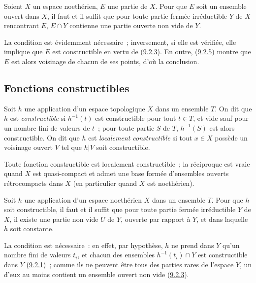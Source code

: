 \begin{corollary}[9.2.6]
\label{0.9.2.6-fr}
Soient $X$ un espace noethérien, $E$ une partie de $X$. Pour que $E$ soit un
ensemble ouvert dans $X$, il faut et il suffit que pour toute partie fermée
irréductible $Y$ de $X$ rencontrant $E$, $E\cap Y$ contienne une partie
ouverte non vide de $Y$.
\end{corollary}

La condition est évidemment nécessaire~; inversement, si elle est vérifiée,
elle implique que $E$ est constructible en vertu de
(\hyperref[0.9.2.3-fr]{9.2.3}). En outre,
(\hyperref[0.9.2.5-fr]{9.2.5}) montre que $E$ est alors voisinage de chacun
de ses points, d'où la conclusion.

\subsection{Fonctions constructibles}
\label{subsection:0.9.3-fr}

\begin{definition}[9.3.1]
\label{0.9.3.1-fr}
Soit $h$ une application d'un espace topologique $X$ dans un ensemble $T$.
On dit que $h$ est \emph{constructible} si $h^{-1}(t)$ est constructible pour
tout $t\in T$, et vide sauf pour un nombre fini de valeurs de $t$~; pour
toute partie $S$ de $T$, $h^{-1}(S)$ est alors constructible. On dit que $h$
est \emph{localement constructible} si tout $x\in X$ possède un voisinage
ouvert $V$ tel que $h|V$ soit constructible.
\end{definition}

Toute fonction constructible est localement constructible~; la réciproque
est vraie quand $X$ est quasi-compact et admet une base formée d'ensembles
ouverts rétrocompacts dans $X$ (en particulier quand $X$ est noethérien).

\begin{proposition}[9.3.2]
\label{0.9.3.2-fr}
Soit $h$ une application d'un espace noethérien $X$ dans un ensemble $T$.
Pour que $h$ soit constructible, il faut et il suffit que pour toute partie
fermée irréductible $Y$ de $X$, il existe une partie non vide $U$ de $Y$,
ouverte par rapport à $Y$, et dans laquelle $h$ soit constante.
\end{proposition}

La condition est nécessaire~: en effet, par hypothèse, $h$ ne prend dans $Y$
qu'un nombre fini de valeurs $t_i$, et chacun des ensembles
$h^{-1}(t_i)\cap Y$ est constructible dans $Y$
(\hyperref[0.9.2.1-fr]{9.2.1})~; comme ils ne peuvent être tous des parties
rares de l'espace $Y$, un d'eux au moins contient un ensemble ouvert non vide
(\hyperref[0.9.2.3-fr]{9.2.3}).

